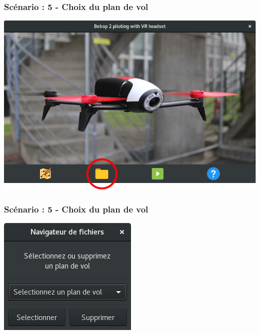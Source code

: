 \documentclass{beamer}
\begin{document}
	\begin{frame}
		\begin{center}
		\frametitle{Scénario : 5 - Choix du plan de vol}

        \includegraphics[scale=0.4]{chooseFile.png}
		\end{center}
	\end{frame}
	


	\begin{frame}
		\begin{center}
		\frametitle{Scénario : 5 - Choix du plan de vol}

        \includegraphics[scale=0.6]{selecteur-GUI.png}
		\end{center}
	\end{frame}
	
	
	
\end{document}
